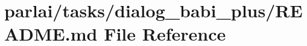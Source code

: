 \hypertarget{parlai_2tasks_2dialog__babi__plus_2README_8md}{}\section{parlai/tasks/dialog\+\_\+babi\+\_\+plus/\+R\+E\+A\+D\+ME.md File Reference}
\label{parlai_2tasks_2dialog__babi__plus_2README_8md}
